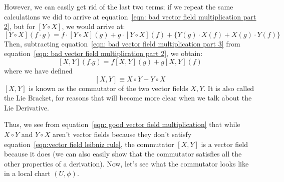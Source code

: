     However, we can easily get rid of the last two terms; if we repeat the
    same calculations we did to arrive at equation~\ref{eqn: bad vector
    field multiplication part 2}, but for $[Y\circ X]$, we would arrive at:
    \begin{equation}
      \label{eqn: bad vector field multiplication part 3}
      [Y\circ X] (f\cdot g) = f\cdot [Y\circ X](g) + g \cdot [Y\circ X](f) + \Big\{Y(g)\cdot X(f) +
      X(g) \cdot Y(f) \Big\}
    \end{equation}
    Then, subtracting equation~\ref{eqn: bad vector field multiplication
    part 3} from equation~\ref{eqn: bad vector field multiplication part
    2}, we obtain:
    \begin{equation}
      \label{eqn: good vector field multiplication}
      [X,Y](f.g) = f[X,Y](g) + g[X,Y](f)
    \end{equation}
    where we have defined 
    \begin{equation}
      \label{eqn: commutator defn}
      [X,Y] \equiv X\circ Y - Y \circ X
    \end{equation}
    $[X,Y]$ is known as the commutator of the two vector fields $X,Y$. It
    is also called the Lie Bracket, for reasons that will become more clear
    when we talk about the Lie Derivative.

    Thus, we see from equation~\ref{eqn: good vector field multiplication}
    that while $X \circ Y$ and $Y \circ X$ aren't vector fields because
    they don't satisfy equation~\ref{eqn:vector field leibniz rule}, the
    commutator $[X,Y]$ is a vector field because it does (we can also
    easily show that the commutator satisfies all the other properties of a
    derivation). Now, let's see what the commutator looks like in a local chart $(U,\phi)$.
